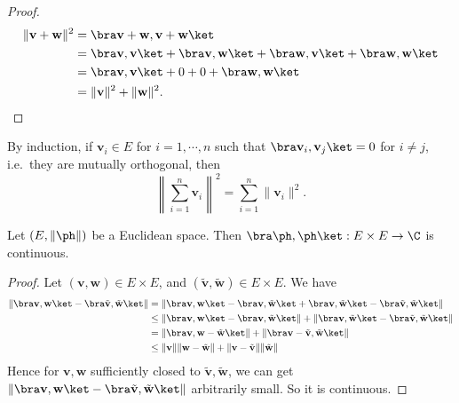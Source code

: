 \documentclass[a4paper]{article}
\begin{document}
\begin{proof}
  \begin{align*}
    \|\mathbf{v} + \mathbf{w}\|^2 &= \bra \mathbf{v} + \mathbf{w}, \mathbf{v} + \mathbf{w}\ket\\
    &= \bra \mathbf{v}, \mathbf{v}\ket + \bra \mathbf{v}, \mathbf{w}\ket + \bra \mathbf{w}, \mathbf{v} \ket + \bra \mathbf{w}, \mathbf{w}\ket\\
    &= \bra \mathbf{v}, \mathbf{v}\ket + 0 + 0 + \bra \mathbf{w}, \mathbf{w}\ket\\
    &= \|\mathbf{v}\|^2 + \|\mathbf{w}\|^2.\qedhere
  \end{align*}
\end{proof}
By induction, if $\mathbf{v}_i \in E$ for $i = 1,\cdots, n$ such that $\bra \mathbf{v}_i, \mathbf{v}_j\ket = 0$ for $i \not= j$, i.e.\ they are mutually orthogonal, then
\[
  \left\|\sum_{i = 1}^n \mathbf{v}_i\right\|^2 = \sum_{i = 1}^n \|\mathbf{v}_i\|^2.
\]
\begin{prop}
  Let $(E, \|\ph\|)$ be a Euclidean space. Then $\bra \ph, \ph\ket: E \times E \to \C$ is continuous.
\end{prop}

\begin{proof}
  Let $(\mathbf{v}, \mathbf{w}) \in E\times E$, and $(\tilde{\mathbf{v}}, \tilde{\mathbf{w}}) \in E\times E$. We have
  \begin{align*}
    \|\bra \mathbf{v}, \mathbf{w}\ket - \bra \tilde{\mathbf{v}}, \tilde{\mathbf{w}}\ket\| &= \|\bra \mathbf{v}, \mathbf{w}\ket - \bra \mathbf{v}, \tilde{\mathbf{w}}\ket + \bra \mathbf{v}, \tilde{\mathbf{w}}\ket - \bra \tilde{\mathbf{v}}, \tilde{\mathbf{w}}\ket\|\\
    &\leq \|\bra \mathbf{v}, \mathbf{w}\ket - \bra \mathbf{v}, \tilde{\mathbf{w}}\ket\| + \|\bra \mathbf{v}, \tilde{\mathbf{w}}\ket - \bra \tilde{\mathbf{v}}, \tilde{\mathbf{w}}\ket\|\\
    &= \|\bra \mathbf{v}, \mathbf{w} - \tilde{\mathbf{w}}\ket \| + \|\bra \mathbf{v} - \tilde{\mathbf{v}}, \tilde{\mathbf{w}}\ket \|\\
    &\leq \|\mathbf{v}\| \|\mathbf{w} - \tilde{\mathbf{w}}\| + \|\mathbf{v} - \tilde{\mathbf{v}}\|\|\tilde{\mathbf{w}}\|
  \end{align*}
  Hence for $\mathbf{v}, \mathbf{w}$ sufficiently closed to $\tilde{\mathbf{v}}, \tilde{\mathbf{w}}$, we can get $\|\bra \mathbf{v}, \mathbf{w}\ket - \bra \tilde{\mathbf{v}}, \tilde{\mathbf{w}}\ket\|$ arbitrarily small. So it is continuous.
\end{proof}
\end{document}
